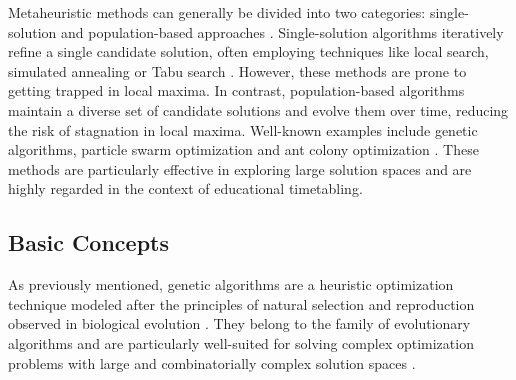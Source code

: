 \documentclass[english,examples]{isasthesis}
\begin{document}
Metaheuristic methods can generally be divided into two categories:
single-solution and population-based approaches \cite{Katoch2021}.
Single-solution algorithms iteratively refine a single candidate solution,
often employing techniques like local search, simulated annealing or Tabu
search \cite{Tan2021,Beligiannis2009}.
However, these methods are prone to getting trapped in local maxima.
In contrast, population-based algorithms maintain a diverse set of candidate
solutions and evolve them over time, reducing the risk of stagnation in local
maxima.
Well-known examples include genetic algorithms, particle swarm optimization and
ant colony optimization \cite{Tan2021,Beligiannis2009}.
These methods are particularly effective in exploring large solution spaces and
are highly regarded in the context of educational timetabling.




\subsection{Basic Concepts}
As previously mentioned, genetic algorithms are a heuristic optimization
technique modeled after the principles of natural selection and reproduction
observed in biological evolution \cite{goldberg1989,Katoch2021}.
They belong to the family of evolutionary algorithms and are particularly
well-suited for solving complex optimization problems with large and
combinatorially complex solution spaces \cite{Katoch2021}.
\end{document}
